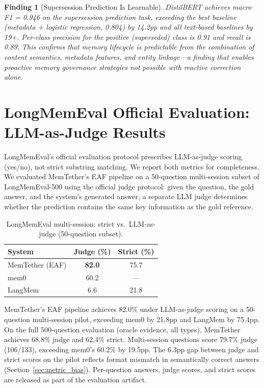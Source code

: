 \documentclass{article}
\newtheorem{finding}{Finding}
\begin{document}
\begin{finding}[Supersession Prediction Is Learnable]
DistilBERT achieves macro F1 = 0.946 on the supersession prediction task, exceeding the best baseline (metadata + logistic regression, 0.804) by 14.2pp and all text-based baselines by 19+. Per-class precision for the positive (superseded) class is 0.91 and recall is 0.89. This confirms that memory lifecycle is predictable from the combination of content semantics, metadata features, and entity linkage---a finding that enables proactive memory governance strategies not possible with reactive correction alone.
\end{finding}




\section{LongMemEval Official Evaluation: LLM-as-Judge Results}
\label{sec:judge}

LongMemEval's official evaluation protocol prescribes LLM-as-judge scoring (yes/no), not strict substring matching. We report both metrics for completeness. We evaluated MemTether's EAF pipeline on a 50-question multi-session subset of LongMemEval-500 using the official judge protocol: given the question, the gold answer, and the system's generated answer, a separate LLM judge determines whether the prediction contains the same key information as the gold reference.

\begin{table}[h]
\centering
\caption{LongMemEval multi-session: strict vs.\ LLM-as-judge (50-question subset).}
\begin{tabular}{lcc}
\toprule
System & Judge (\%) & Strict (\%) \\
\midrule
MemTether (EAF) & \textbf{82.0} & 75.7 \\
mem0 & 60.2 & --- \\
LangMem & 6.6 & 21.8 \\
\bottomrule
\end{tabular}
\end{table}

MemTether's EAF pipeline achieves 82.0\% under LLM-as-judge scoring on a 50-question multi-session pilot, exceeding mem0 by 21.8pp and LangMem by 75.4pp. On the full 500-question evaluation (oracle evidence, all types), MemTether achieves 68.8\% judge and 62.4\% strict. Multi-session questions score 79.7\% judge (106/133), exceeding mem0's 60.2\% by 19.5pp. The 6.3pp gap between judge and strict scores on the pilot reflects format mismatch in semantically correct answers (Section~\ref{sec:metric_bias}). Per-question answers, judge scores, and strict scores are released as part of the evaluation artifact.
\end{document}
